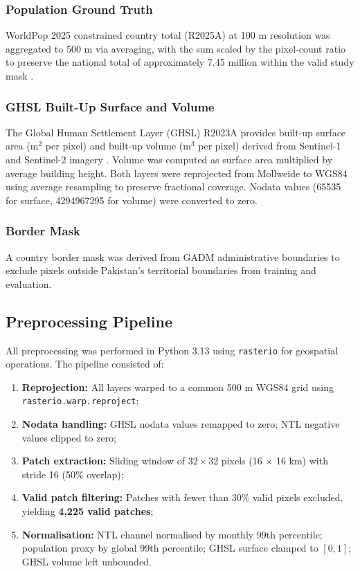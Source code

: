 \documentclass[12pt,a4paper]{article}
\begin{document}
\subsubsection{Population Ground Truth}

WorldPop 2025 constrained country total (R2025A) at 100 m resolution was aggregated to 500 m via averaging, with the sum scaled by the pixel-count ratio to preserve the national total of approximately 7.45 million within the valid study mask \citep{worldpop2025}.

\subsubsection{GHSL Built-Up Surface and Volume}

The Global Human Settlement Layer (GHSL) R2023A provides built-up surface area (m$^2$ per pixel) and built-up volume (m$^3$ per pixel) derived from Sentinel-1 and Sentinel-2 imagery \citep{pesaresi2023ghslv}. Volume was computed as surface area multiplied by average building height. Both layers were reprojected from Mollweide to WGS84 using average resampling to preserve fractional coverage. Nodata values (65535 for surface, 4294967295 for volume) were converted to zero.

\subsubsection{Border Mask}

A country border mask was derived from GADM administrative boundaries to exclude pixels outside Pakistan's territorial boundaries from training and evaluation.

\subsection{Preprocessing Pipeline}
\label{subsec:preprocessing}

All preprocessing was performed in Python 3.13 using \texttt{rasterio} for geospatial operations. The pipeline consisted of:

\begin{enumerate}
    \item \textbf{Reprojection:} All layers warped to a common 500 m WGS84 grid using \texttt{rasterio.warp.reproject};
    \item \textbf{Nodata handling:} GHSL nodata values remapped to zero; NTL negative values clipped to zero;
    \item \textbf{Patch extraction:} Sliding window of $32 \times 32$ pixels (16 $\times$ 16 km) with stride 16 (50\% overlap);
    \item \textbf{Valid patch filtering:} Patches with fewer than 30\% valid pixels excluded, yielding \textbf{4,225 valid patches};
    \item \textbf{Normalisation:} NTL channel normalised by monthly 99th percentile; population proxy by global 99th percentile; GHSL surface clamped to $[0, 1]$; GHSL volume left unbounded.
\end{enumerate}
\end{document}
